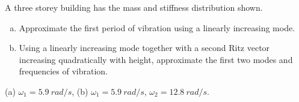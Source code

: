 
\begin{Exercise}[label={three_storey}]
A three storey building has the mass and stiffness distribution shown.

\begin{enumerate}[(a)]
    \item Approximate the first period of vibration using a linearly increasing mode.
    \item Using a linearly increasing mode together with a second Ritz vector increasing quadratically with height, approximate the first two modes and frequencies of vibration.
\end{enumerate}    

\begin{center}
\end{center}
\shortAnswer (a) $\omega_1 = \SI{5.9}{rad/s}$, (b) $\omega_1 = \SI{5.9}{rad/s}$, $\omega_2 = \SI{12.8}{rad/s}$.
\end{Exercise}



